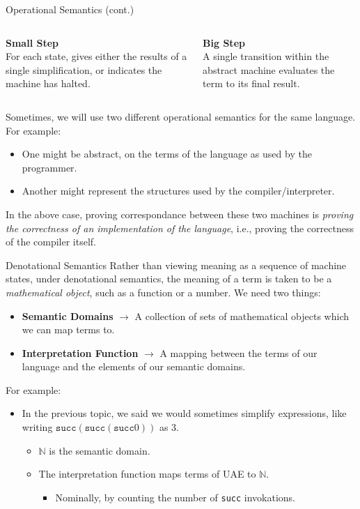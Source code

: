 \documentclass[11pt]{beamer}
\begin{document}
\begin{frame}[fragile=singleslide]{Operational Semantics (cont.)}
\begin{columns}
\begin{column}{0.5\textwidth}
\textbf{Small Step} \\
For each state, gives either the results of a single simplification, or indicates the machine has halted.  
\end{column}
\begin{column}{0.5\textwidth} 
\textbf{Big Step} \\
A single transition within the abstract machine evaluates the term to its final result.  
\vspace{1em}
\end{column}
\end{columns}
\vspace{0.5em}
Sometimes, we will use two different operational semantics for the same language.  For example:
\begin{itemize}
\item One might be abstract, on the terms of the language as used by the programmer.
\item Another might represent the structures used by the compiler/interpreter.
\end{itemize}
In the above case, proving correspondance between these two machines is \emph{proving the correctness of an implementation of the language}, i.e., proving the correctness of the compiler itself.  
\end{frame}

\begin{frame}[fragile=singleslide]{Denotational Semantics}
Rather than viewing meaning as a sequence of machine states, under denotational semantics, the meaning of a term is taken to be a \emph{mathematical object}, such as a function or a number.  We need two things:
\begin{itemize}
\item \textbf{Semantic Domains} $\rightarrow$ A collection of sets of mathematical objects which we can map terms to.
\item \textbf{Interpretation Function} $\rightarrow$ A mapping between the terms of our language and the elements of our semantic domains.  
\end{itemize}
For example:
\begin{itemize}
\item In the previous topic, we said we would sometimes simplify expressions, like writing $\texttt{succ} (\texttt{succ} (\texttt{succ} 0))$ as $3$.
\begin{itemize}
\item $\mathbb{N}$ is the semantic domain.
\item The interpretation function maps terms of UAE to $\mathbb{N}$.
\begin{itemize}
\item Nominally, by counting the number of \texttt{succ} invokations.
\end{itemize}
\end{itemize}
\end{itemize}
\end{frame}
\end{document}

